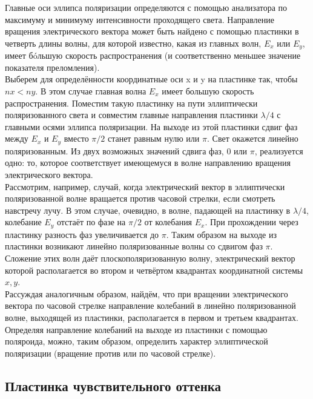 Главные оси эллипса поляризации определяются с помощью анализатора по максимуму и минимуму
интенсивности проходящего света. Направление вращения электрического вектора может быть
найдено с помощью пластинки в четверть длины волны, для которой известно, какая из главных
волн, $ E_x $ или $ E_y $, имеет б\'{o}льшую скорость распространения (и соответственно
меньшее значение показателя преломления). \\

Выберем для определённости координатные оси x и y на пластинке так, чтобы $ nx < ny $. В
этом случае главная волна $ E_x $ имеет большую скорость распространения. Поместим такую
пластинку на пути эллиптически поляризованного света и совместим главные направления пластинки
$ \lambda/4 $ с главными осями эллипса поляризации. На выходе из этой пластинки сдвиг фаз
между $ E_x $ и $ E_y $ вместо $ \pi/2 $ станет равным нулю или $ \pi $. Свет окажется
линейно поляризованным. Из двух возможных значений сдвига фаз, 0 или $ \pi $, реализуется
одно: то, которое соответствует имеющемуся в волне направлению вращения электрического
вектора. \\

Рассмотрим, например, случай, когда электрический вектор в эллиптически поляризованной
волне вращается против часовой стрелки, если смотреть навстречу лучу. В этом случае,
очевидно, в волне, падающей на пластинку в $ \lambda/4 $, колебание $ E_y $ отстаёт по
фазе на $ \pi/2 $ от колебания $ E_x $. При прохождении через пластинку разность фаз
увеличивается до $ \pi $. Таким образом на выходе из пластинки возникают линейно
поляризованные волны со сдвигом фаз $ \pi $. Сложение этих волн даёт плоскополяризованную
волну, электрический вектор которой располагается во втором и четвёртом квадрантах
координатной системы $ x, y $. \\

Рассуждая аналогичным образом, найдём, что при вращении электрического вектора по часовой
стрелке направление колебаний в линейно поляризованной волне, выходящей из пластинки,
располагается в первом и третьем квадрантах. Определяя направление колебаний на выходе из
пластинки с помощью поляроида, можно, таким образом, определить характер эллиптической
поляризации (вращение против или по часовой стрелке).

\subsection{Пластинка чувствительного оттенка}



